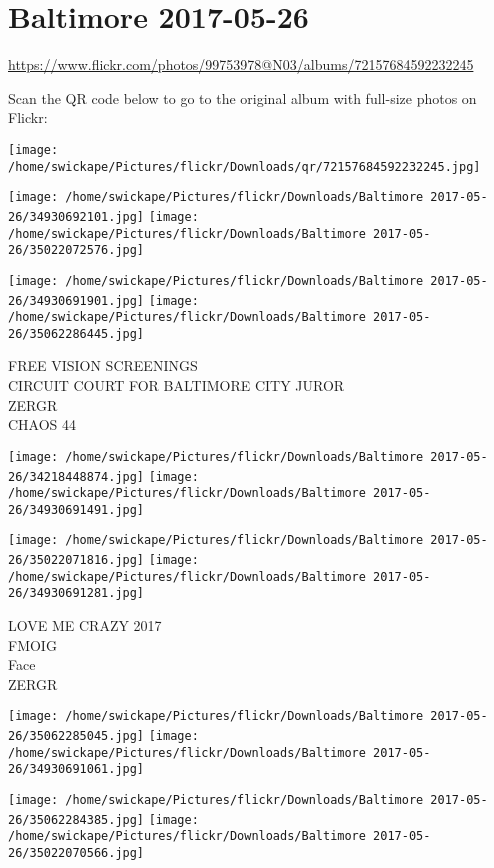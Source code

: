 \documentclass[10pt,letterpaper]{article}
\title{}
\author{}
\date{}
\begin{document}
\section*{Baltimore 2017-05-26}

\url{https://www.flickr.com/photos/99753978@N03/albums/72157684592232245}

Scan the QR code below to go to the original album with full-size photos on Flickr:

\texttt{[image: /home/swickape/Pictures/flickr/Downloads/qr/72157684592232245.jpg]}
\pagebreak

\texttt{[image: /home/swickape/Pictures/flickr/Downloads/Baltimore 2017-05-26/34930692101.jpg]}
\texttt{[image: /home/swickape/Pictures/flickr/Downloads/Baltimore 2017-05-26/35022072576.jpg]}

\texttt{[image: /home/swickape/Pictures/flickr/Downloads/Baltimore 2017-05-26/34930691901.jpg]}
\texttt{[image: /home/swickape/Pictures/flickr/Downloads/Baltimore 2017-05-26/35062286445.jpg]}

FREE VISION SCREENINGS\\
CIRCUIT COURT FOR BALTIMORE CITY JUROR\\
ZERGR\\
CHAOS 44
\pagebreak

\texttt{[image: /home/swickape/Pictures/flickr/Downloads/Baltimore 2017-05-26/34218448874.jpg]}
\texttt{[image: /home/swickape/Pictures/flickr/Downloads/Baltimore 2017-05-26/34930691491.jpg]}

\texttt{[image: /home/swickape/Pictures/flickr/Downloads/Baltimore 2017-05-26/35022071816.jpg]}
\texttt{[image: /home/swickape/Pictures/flickr/Downloads/Baltimore 2017-05-26/34930691281.jpg]}

LOVE ME CRAZY 2017\\
FMOIG\\
Face\\
ZERGR
\pagebreak

\texttt{[image: /home/swickape/Pictures/flickr/Downloads/Baltimore 2017-05-26/35062285045.jpg]}
\texttt{[image: /home/swickape/Pictures/flickr/Downloads/Baltimore 2017-05-26/34930691061.jpg]}

\texttt{[image: /home/swickape/Pictures/flickr/Downloads/Baltimore 2017-05-26/35062284385.jpg]}
\texttt{[image: /home/swickape/Pictures/flickr/Downloads/Baltimore 2017-05-26/35022070566.jpg]}
\end{document}
